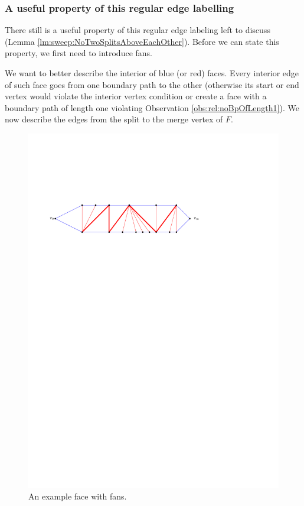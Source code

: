 \subsubsection{A useful property of this regular edge labelling}
  There still is a useful property of this regular edge labeling left to discuss (Lemma \ref{lm:sweep:NoTwoSplitsAboveEachOther}). Before we can state this property, we first need to introduce fans.

    We want to better describe the interior of blue (or red) faces. Every interior edge of such face goes from one boundary path to the other (otherwise its start or end vertex would violate the interior vertex condition or create a face with a boundary path of length one violating Observation \ref{obs:rel:noBpOfLength1}). We now describe the edges from the split to the merge vertex of $F$.

    \begin{figure}[t]
      \centering
      \includegraphics[scale=.9]{rectangularDuals/img/fans}
      \caption{An example face with fans.}
      \label{fig:uni:fans}
    \end{figure}

